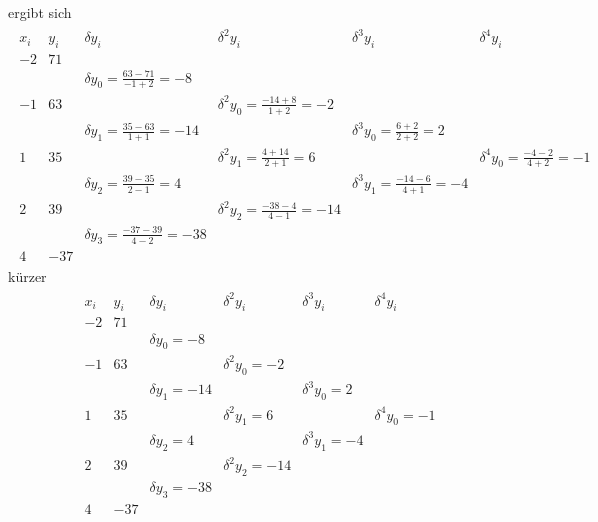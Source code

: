 \documentclass[10pt,a4paper]{article}
\begin{document}
ergibt sich
\begin{align*}
\begin{array}{cc|cccc}
	x_i & y_i &              \delta y_i               &              \delta^2 y_i              &             \delta^3 y_i              &             \delta^4 y_i             \\ \hline
	-2  & 71  &  \\
	    &     & \delta y_0 = \frac{63-71}{-1+2} = -8  &  \\
	-1  & 63  &                                       & \delta^2 y_0 = \frac{-14+8}{1+2} = -2  &  \\
	    &     & \delta y_1 = \frac{35-63}{1+1} = -14  &                                        &  \delta^3 y_0 = \frac{6+2}{2+2} = 2   &  \\
	 1  & 35  &                                       &  \delta^2 y_1 = \frac{4+14}{2+1} = 6   &                                       & \delta^4 y_0 = \frac{-4-2}{4+2} = -1 \\
	    &     &  \delta y_2 = \frac{39-35}{2-1} = 4   &                                        & \delta^3 y_1 = \frac{-14-6}{4+1} = -4 &  \\
	 2  & 39  &                                       & \delta^2 y_2 = \frac{-38-4}{4-1} = -14 &                                       &  \\
	    &     & \delta y_3 = \frac{-37-39}{4-2} = -38 &  \\
	 4  & -37 &                                       &
\end{array}
\end{align*}
kürzer
\begin{align*}
\begin{array}{cc|cccc}
	x_i & y_i &    \delta y_i    &    \delta^2 y_i    &   \delta^3 y_i    &   \delta^4 y_i    \\ \hline
	-2  & 71  &  \\
	    &     & \delta y_0 = -8  &  \\
	-1  & 63  &                  & \delta^2 y_0 = -2  &  \\
	    &     & \delta y_1 = -14 &                    & \delta^3 y_0 = 2  &  \\
	 1  & 35  &                  &  \delta^2 y_1 = 6  &                   & \delta^4 y_0 = -1 \\
	    &     &  \delta y_2 = 4  &                    & \delta^3 y_1 = -4 &  \\
	 2  & 39  &                  & \delta^2 y_2 = -14 &                   &  \\
	    &     & \delta y_3 = -38 &  \\
	 4  & -37 &                  &
\end{array}
\end{align*}
\end{document}
